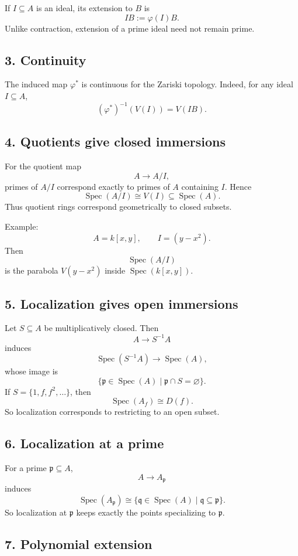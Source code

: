 \documentclass[12pt,a4paper]{article}
\theoremstyle{plain}
\theoremstyle{definition}      %
\begin{document}
If \(I\subseteq A\) is an ideal, its extension to \(B\) is
\[
IB:=\varphi(I)B.
\]
Unlike contraction, extension of a prime ideal need not remain prime.

\subsection*{3. Continuity}

The induced map \(\varphi^*\) is continuous for the Zariski topology. Indeed, for any ideal \(I\subseteq A\),
\[
(\varphi^*)^{-1}(V(I))=V(IB).
\]

\subsection*{4. Quotients give closed immersions}

For the quotient map
\[
A\to A/I,
\]
primes of \(A/I\) correspond exactly to primes of \(A\) containing \(I\). Hence
\[
\operatorname{Spec}(A/I)\cong V(I)\subseteq \operatorname{Spec}(A).
\]
Thus quotient rings correspond geometrically to closed subsets.

Example:
\[
A=k[x,y],\qquad I=(y-x^2).
\]
Then
\[
\operatorname{Spec}(A/I)
\]
is the parabola \(V(y-x^2)\) inside \(\operatorname{Spec}(k[x,y])\).

\subsection*{5. Localization gives open immersions}

Let \(S\subseteq A\) be multiplicatively closed. Then
\[
A\to S^{-1}A
\]
induces
\[
\operatorname{Spec}(S^{-1}A)\to \operatorname{Spec}(A),
\]
whose image is
\[
\{\mathfrak p\in\operatorname{Spec}(A)\mid \mathfrak p\cap S=\varnothing\}.
\]
If \(S=\{1,f,f^2,\dots\}\), then
\[
\operatorname{Spec}(A_f)\cong D(f).
\]
So localization corresponds to restricting to an open subset.

\subsection*{6. Localization at a prime}

For a prime \(\mathfrak p\subseteq A\),
\[
A\to A_{\mathfrak p}
\]
induces
\[
\operatorname{Spec}(A_{\mathfrak p})
\cong
\{\mathfrak q\in\operatorname{Spec}(A)\mid \mathfrak q\subseteq \mathfrak p\}.
\]
So localization at \(\mathfrak p\) keeps exactly the points specializing to \(\mathfrak p\).

\subsection*{7. Polynomial extension}
\end{document}
